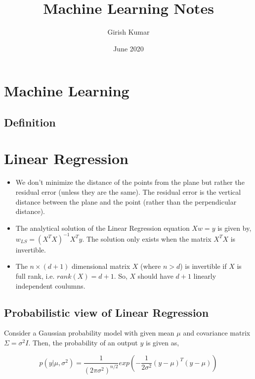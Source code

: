 \documentclass{article}
\title{Machine Learning Notes}
\author{Girish Kumar }
\date{June 2020}
\begin{document}
\maketitle

\setcounter{secnumdepth}{0}
\tableofcontents

\section{Machine Learning}
\subsection{Definition}



\section{Linear Regression}

\begin{itemize}
    \item We don't minimize the distance of the points from the plane but rather the residual error (unless they are the same). The residual error is the vertical distance between the plane and the point (rather than the perpendicular distance).
    
    \item The analytical solution of the Linear Regression equation $Xw=y$ is given by, $w_{LS}=(X^TX)^{-1}X^Ty$. The solution only exists when the matrix $X^TX$ is invertible.
    
    \item The $n \times (d+1)$ dimensional matrix $X$ (where $n>d$) is invertible if $X$ is full rank, i.e. $rank(X)=d+1$. So, $X$ should have $d+1$ linearly independent coulumns.
\end{itemize}

\subsection{Probabilistic view of Linear Regression}

Consider a Gaussian probability model with given mean $\mu$ and covariance matrix $\Sigma = \sigma^2I$. Then, the probability of an output $y$ is given as,

\begin{equation*}
    p(y\vert \mu, \sigma^2) = \frac{1}{(2\pi\sigma^2)^{n/2}}exp\left(-\frac{1}{2\sigma^2}(y-\mu)^T(y-\mu)\right) 
\end{equation*}
\end{document}
